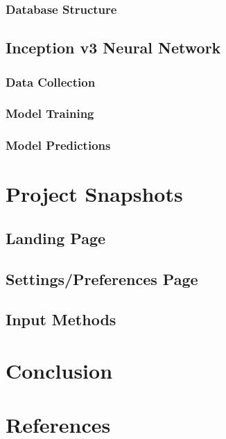\documentclass[14pt]{report}
\begin{document}
			\subsection{Database Structure}
		
		\section{Inception v3 Neural Network}
			\subsection{Data Collection}
			\subsection{Model Training}
			\subsection{Model Predictions}


	\newpage


	\chapter{Project Snapshots}\label{chapter5}
		
	

		\section{Landing Page}
		\section{Settings/Preferences Page}
		\section{Input Methods}

	\newpage


	\chapter{Conclusion}\label{chapter6}
		
	

	\newpage


	\chapter*{References}\label{chapter7}
		
	

	\newpage
\end{document}
